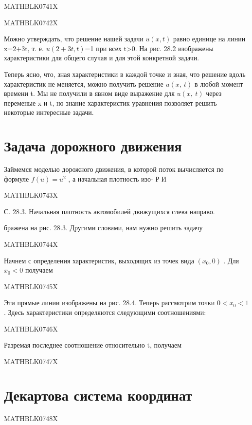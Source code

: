 \documentclass[
]{article}
\begin{document}
{{{MATHBLK0741X

MATHBLK0742X

Можно утверждать, что решение нашей задачи \(u(x, t)\) равно единице на
линин x=2+3t, т. е. \(u(2+3t, t)\)=1 при всех t\textgreater0. На рис.
28.2 изображены характеристики для общего случая и для этой конкретной
задачи.

Теперь ясно, что, зная характеристики в каждой точке и зная, что решение
вдоль характеристик не меняется, можно получить решение
\(u\left(x,\ t\right)\) в любой момент времени t. Мы не получили в явном
виде выражение для \(u\left(x,\ t\right)\) через переменые x и t, но
знание характеристик уравнения позволяет решить некоторые интересные
задачи.

\section{Задача дорожного
движения}\label{ux437ux430ux434ux430ux447ux430-ux434ux43eux440ux43eux436ux43dux43eux433ux43e-ux434ux432ux438ux436ux435ux43dux438ux44f}

Займемся моделью дорожного движения, в которой поток вычисляется по
формуле \(f(u)=u^2\) , а начальная плотность изо- Р И

MATHBLK0743X

С. 28.3. Начальная плотность автомобилей движущихся слева направо.

бражена на рис. 28.3. Другими словами, нам нужно решить задачу

MATHBLK0744X

Начнем с определения характеристик, выходящих из точек вида \((x_0, 0)\)
. Для \(x_0 < 0\) получаем

MATHBLK0745X

Эти прямые линии изображены на рис. 28.4. Теперь рассмотрим точки
\(0 < x_0 < 1\) . Здесь характеристики определяются следующими
соотношениями:

MATHBLK0746X

Разремая последнее соотношение относительно t, получаем

MATHBLK0747X

\section{Декартова система
координат}\label{ux434ux435ux43aux430ux440ux442ux43eux432ux430-ux441ux438ux441ux442ux435ux43cux430-ux43aux43eux43eux440ux434ux438ux43dux430ux442}

MATHBLK0748X

}}}
\end{document}
